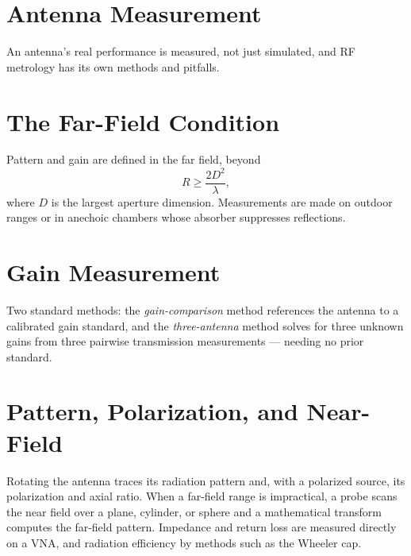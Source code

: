 \section{Antenna Measurement}\label{sec:tb_antenna_meas}



An antenna's real performance is measured, not just simulated, and RF metrology
has its own methods and pitfalls.

\section{The Far-Field Condition}
Pattern and gain are defined in the far field, beyond
\[ R \ge \frac{2 D^2}{\lambda}, \]
where $D$ is the largest aperture dimension. Measurements are made on outdoor
ranges or in anechoic chambers whose absorber suppresses reflections.

\section{Gain Measurement}
Two standard methods: the \emph{gain-comparison} method references the antenna to
a calibrated gain standard, and the \emph{three-antenna} method solves for three
unknown gains from three pairwise transmission measurements --- needing no prior
standard.

\section{Pattern, Polarization, and Near-Field}
Rotating the antenna traces its radiation pattern and, with a polarized source,
its polarization and axial ratio. When a far-field range is impractical, a probe
scans the near field over a plane, cylinder, or sphere and a mathematical
transform computes the far-field pattern. Impedance and return loss are measured
directly on a VNA, and radiation efficiency by methods such as the Wheeler cap.



